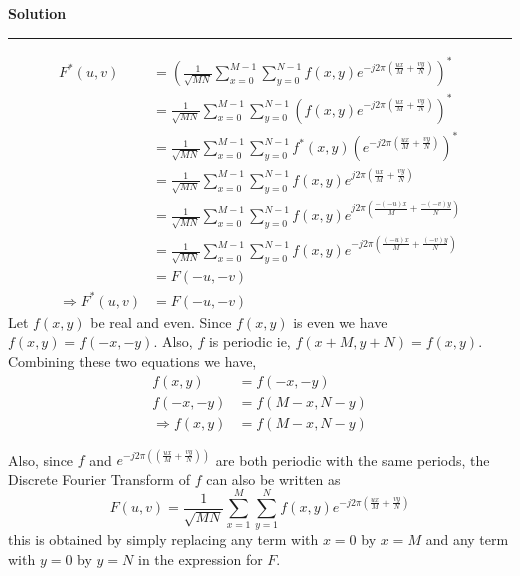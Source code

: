 \documentclass[a4paper]{article}
\newenvironment{solution}[2][]{%
    \begin{mdframed}[linecolor=green!60!black, linewidth=2pt, roundcorner=10pt, backgroundcolor=green!5!white, skipabove=12pt, skipbelow=12pt]%
        \textbf{\large #2} %
        \par\noindent\rule{\textwidth}{0.4pt} %
        \vspace{0.5em} %
}{%
    \end{mdframed}%
}
\begin{document}
\begin{solution}{Solution}
  \begin{align*}
    F^{*}(u,v) &= {\left(\frac{1}{\sqrt{MN}}\sum\limits_{x = 0}^{M - 1}\sum\limits_{y = 0}^{N - 1} 
    f(x,y) e^{-j2\pi \left(\frac{ux}{M} + \frac{vy}{N}\right)}\right)}^{*} \\
    &= \frac{1}{\sqrt{MN}}\sum\limits_{x = 0}^{M - 1}\sum\limits_{y = 0}^{N - 1} 
    {\left(f(x,y) e^{-j2\pi \left(\frac{ux}{M} + \frac{vy}{N}\right)}\right)}^{*} \\
    &= \frac{1}{\sqrt{MN}}\sum\limits_{x = 0}^{M - 1}\sum\limits_{y = 0}^{N - 1} 
    f^{*}(x,y) {\left(e^{-j2\pi \left(\frac{ux}{M} + \frac{vy}{N}\right)}\right)}^{*} \\
    &= \frac{1}{\sqrt{MN}}\sum\limits_{x = 0}^{M - 1}\sum\limits_{y = 0}^{N - 1} 
    f(x,y) e^{j2\pi \left(\frac{ux}{M} + \frac{vy}{N}\right)} \\
    &= \frac{1}{\sqrt{MN}}\sum\limits_{x = 0}^{M - 1}\sum\limits_{y = 0}^{N - 1} 
    f(x,y) e^{j2\pi \left(\frac{-(-u)x}{M} + \frac{-(-v)y}{N}\right)} \\ 
    &= \frac{1}{\sqrt{MN}}\sum\limits_{x = 0}^{M - 1}\sum\limits_{y = 0}^{N - 1} 
    f(x,y) e^{-j2\pi \left(\frac{(-u)x}{M} + \frac{(-v)y}{N}\right)} \\
    &= F(-u,-v) \\
    \Rightarrow F^{*}(u,v) &= F(-u,-v)
  \end{align*}
  Let $f(x,y)$ be real and even. Since $f(x,y)$ is even we have $f(x,y) = f(-x,-y)$. Also, $f$ is periodic ie, $f(x + M,y + N) = f(x,y)$. Combining these 
  two equations we have,
  \begin{align}
    f(x,y) &= f(-x,-y) \nonumber \\
    f(-x,-y) &= f(M - x,N - y) \nonumber \\
    \Rightarrow \label{even}f(x,y) &= f(M - x,N - y)     
  \end{align}
  
  Also, since $f$ and $e^{-j 2\pi \left((\frac{ux}{M} + \frac{vy}{N})\right)}$ are both periodic with the same periods,
  the Discrete Fourier Transform of $f$ can also be written as 
  \begin{equation}
    \label{dft}F(u,v) = \frac{1}{\sqrt{MN}}\sum\limits_{x = 1}^{M}\sum\limits_{y = 1}^{N} f(x,y) e^{-j2\pi \left(\frac{ux}{M} + \frac{vy}{N}\right)}
  \end{equation}
  this is obtained by simply replacing any term with $x = 0$ by $x = M$ and any term with $y = 0$ by $y = N$ in the expression for $F$.


\end{solution}
\end{document}
